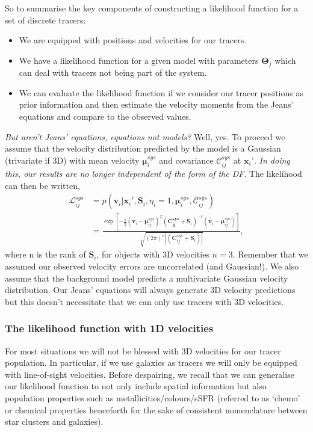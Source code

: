So to summarise the key components of constructing a likelihood function for a set of discrete tracers: 
\begin{itemize}
    \item We are equipped with positions and velocities for our tracers.
    \item We have a likelihood function for a given model with parameters $\boldsymbol{\Theta}_{j}$ which can deal with tracers not being part of the system.
    \item We can evaluate the likelihood function if we consider our tracer positions as prior information and then estimate the velocity moments from the Jeans' equations and compare to the observed values.
\end{itemize}
\textit{But aren't Jeans' equations, equations not models?} Well, yes. To proceed we assume that the velocity distribution predicted by the model is a Gaussian (trivariate if 3D) with mean velocity $\boldsymbol{\mu}_{i}^{sys}$ and covariance $\boldsymbol{\mathcal{C}}_{ij}^{sys}$ at $\boldsymbol{x}_i'$. \textit{In doing this, our results are no longer independent of the form of the DF}. The likelihood can then be written, 
\begin{align*}
\mathcal{L}_{ij}^{sys} &= p(\boldsymbol{v}_i|\boldsymbol{x}_{i}',\boldsymbol{S}_i,\eta_i=1,\boldsymbol{\mu}_{i}^{sys},\boldsymbol{\mathcal{C}}_{ij}^{sys}) \\ &= \frac{\exp{\left[-\frac{1}{2}(\boldsymbol{v}_i - \boldsymbol{\mu}_{ij}^{sys})^{T}(\boldsymbol{C_{ij}^{sys}} + \boldsymbol{S}_i)^{-1}(\boldsymbol{v}_i - \boldsymbol{\mu}_{ij}^{sys}) \right]}}{\sqrt{(2\pi)^{n}|(\boldsymbol{C}_{ij}^{sys}+\boldsymbol{S}_i)|}},
\end{align*}
where n is the rank of $\boldsymbol{S}_i$, for objects with 3D velocities $n=3$. Remember that we assumed our observed velocity errors are uncorrelated (and Gaussian!). We also assume that the background model predicts a multivariate Gaussian velocity distribution. Our Jeans' equations will always generate 3D velocity predictions but this doesn't necessitate that we can only use tracers with 3D velocities. 

\subsubsection{The likelihood function with 1D velocities} 
For most situations we will not be blessed with 3D velocities for our tracer population. In particular, if we use galaxies as tracers we will only be equipped with line-of-sight velocities. Before despairing, we recall that we can generalise our likelihood function to not only include spatial information but also population properties such as metallicities/colours/sSFR (referred to as `chemo' or chemical properties henceforth for the sake of consistent nomenclature between star clusters and galaxies). 

